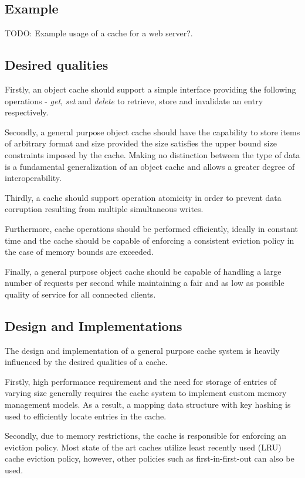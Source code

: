 \subsection{Example}
TODO: Example usage of a cache for a web server?.


\subsection{Desired qualities}
Firstly, an object cache should support a simple interface providing the following operations - \textit{get}, \textit{set} and \textit{delete} to retrieve, store and invalidate an entry respectively.

Secondly, a general purpose object cache should have the capability to store items of arbitrary format and size provided the size satisfies the upper bound size constraints imposed by the cache. Making no distinction between the type of data is a fundamental generalization of an object cache and allows a greater degree of interoperability.

Thirdly, a cache should support operation atomicity in order to prevent data corruption resulting from multiple simultaneous writes.

Furthermore, cache operations should be performed efficiently, ideally in constant time and the cache should be capable of enforcing a consistent eviction policy in the case of memory bounds are exceeded.

Finally, a general purpose object cache should be capable of handling a large number of requests per second while maintaining a fair and as low as possible quality of service for all connected clients.


\subsection{Design and Implementations}
The design and implementation of a general purpose cache system is heavily influenced by the desired qualities of a cache.

Firstly, high performance requirement and the need for storage of entries of varying size generally requires the cache system to implement custom memory management models. As a result, a mapping data structure  with key hashing is used to efficiently locate entries in the cache.

Secondly, due to memory restrictions, the cache is responsible for enforcing an eviction policy. Most state of the art caches utilize least recently used (LRU) cache eviction policy, however, other policies such as first-in-first-out can also be used.

